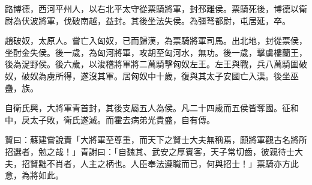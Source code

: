 \begin{pinyinscope}
路博德，西河平州人，以右北平太守從票騎將軍，封邳離侯。票騎死後，博德以衛尉為伏波將軍，伐破南越，益封。其後坐法失侯。為彊弩都尉，屯居延，卒。

趙破奴，太原人。嘗亡入匈奴，已而歸漢，為票騎將軍司馬。出北地，封從票侯，坐酎金失侯。後一歲，為匈河將軍，攻胡至匈河水，無功。後一歲，擊虜樓蘭王，後為浞野侯。後六歲，以浚稽將軍將二萬騎擊匈奴左王。左王與戰，兵八萬騎圍破奴，破奴為虜所得，遂沒其軍。居匈奴中十歲，復與其太子安國亡入漢。後坐巫蠱，族。

自衛氏興，大將軍青首封，其後支屬五人為侯。凡二十四歲而五侯皆奪國。征和中，戾太子敗，衛氏遂滅。而霍去病弟光貴盛，自有傳。

贊曰：蘇建嘗說責「大將軍至尊重，而天下之賢士大夫無稱焉，願將軍觀古名將所招選者，勉之哉！」青謝曰：「自魏其、武安之厚賓客，天子常切齒，彼親待士大夫，招賢黜不肖者，人主之柄也。人臣奉法遵職而已，何與招士！」票騎亦方此意，為將如此。


\end{pinyinscope}